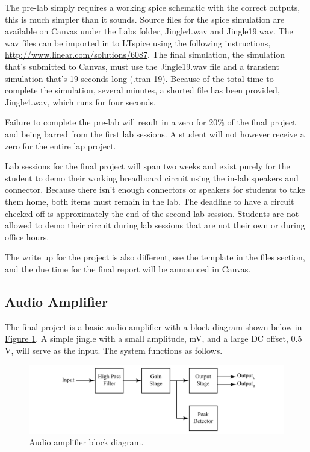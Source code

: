The pre-lab simply requires a working spice schematic with the correct outputs, this is much simpler than it sounds. Source files for the spice simulation are available on Canvas under the Labs folder, Jingle4.wav and Jingle19.wav. The wav files can be imported in to LTspice using the following instructions, \url{http://www.linear.com/solutions/6087}. The final simulation, the simulation that's submitted to Canvas, must use the Jingle19.wav file and a transient simulation that's 19 seconds long (.tran 19). Because of the total time to complete the simulation, several minutes, a shorted file has been provided, Jingle4.wav, which runs for four seconds. 

Failure to complete the pre-lab will result in a zero for 20\% of the final project and being barred from the first lab sessions. A student will not however receive a zero for the entire lap project. 

Lab sessions for the final project will span two weeks and exist purely for the student to demo their working breadboard circuit using the in-lab speakers and connector. Because there isn't enough connectors or speakers for students to take them home, both items must remain in the lab. The deadline to have a circuit checked off is approximately the end of the second lab session. Students are not allowed to demo their circuit during lab sessions that are not their own or during office hours.

The write up for the project is also different, see the template in the files section, and the due time for the final report will be announced in Canvas.


\subsection{Audio Amplifier}


The final project is a basic audio amplifier with a block diagram shown below in \hyperref[fig:10blockDia]{Figure \ref*{fig:10blockDia}}. A simple jingle with a small amplitude, mV, and a large DC offset, 0.5 V, will serve as the input. The system functions as follows.

\begin{figure}[h]
	\centering
		\includegraphics[width=1\textwidth]{Lab10blockdia.pdf}
	\caption{Audio amplifier block diagram. } \label{fig:10blockDia}
\end{figure}

